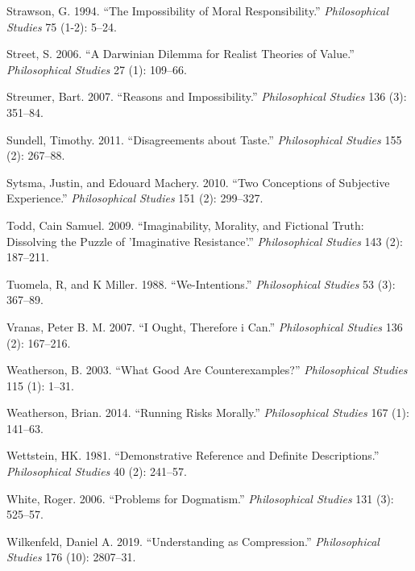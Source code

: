 \documentclass[
  10pt,
  letterpaper,
  DIV=11,
  numbers=noendperiod,
  twoside]{scrartcl}
\newlength{\cslhangindent}
\newenvironment{CSLReferences}[2] %
 {\begin{list}{}{%
  \setlength{\itemindent}{0pt}
  \setlength{\leftmargin}{0pt}
  \setlength{\parsep}{0pt}
  \ifodd #1
   \setlength{\leftmargin}{\cslhangindent}
   \setlength{\itemindent}{-1\cslhangindent}
  \fi
  \setlength{\itemsep}{#2\baselineskip}}}
 {\end{list}}
\begin{document}
\begin{CSLReferences}{1}{0}
Strawson, G. 1994. {``The Impossibility of Moral Responsibility.''}
\emph{Philosophical Studies} 75 (1-2): 5--24.

Street, S. 2006. {``A Darwinian Dilemma for Realist Theories of
Value.''} \emph{Philosophical Studies} 27 (1): 109--66.

Streumer, Bart. 2007. {``Reasons and Impossibility.''}
\emph{Philosophical Studies} 136 (3): 351--84.

Sundell, Timothy. 2011. {``Disagreements about Taste.''}
\emph{Philosophical Studies} 155 (2): 267--88.

Sytsma, Justin, and Edouard Machery. 2010. {``Two Conceptions of
Subjective Experience.''} \emph{Philosophical Studies} 151 (2):
299--327.

Todd, Cain Samuel. 2009. {``Imaginability, Morality, and Fictional
Truth: Dissolving the Puzzle of 'Imaginative Resistance'.''}
\emph{Philosophical Studies} 143 (2): 187--211.

Tuomela, R, and K Miller. 1988. {``We-Intentions.''} \emph{Philosophical
Studies} 53 (3): 367--89.

Vranas, Peter B. M. 2007. {``I Ought, Therefore i Can.''}
\emph{Philosophical Studies} 136 (2): 167--216.

Weatherson, B. 2003. {``What Good Are Counterexamples?''}
\emph{Philosophical Studies} 115 (1): 1--31.

Weatherson, Brian. 2014. {``Running Risks Morally.''}
\emph{Philosophical Studies} 167 (1): 141--63.

Wettstein, HK. 1981. {``Demonstrative Reference and Definite
Descriptions.''} \emph{Philosophical Studies} 40 (2): 241--57.

White, Roger. 2006. {``Problems for Dogmatism.''} \emph{Philosophical
Studies} 131 (3): 525--57.

Wilkenfeld, Daniel A. 2019. {``Understanding as Compression.''}
\emph{Philosophical Studies} 176 (10): 2807--31.


\end{CSLReferences}
\end{document}
